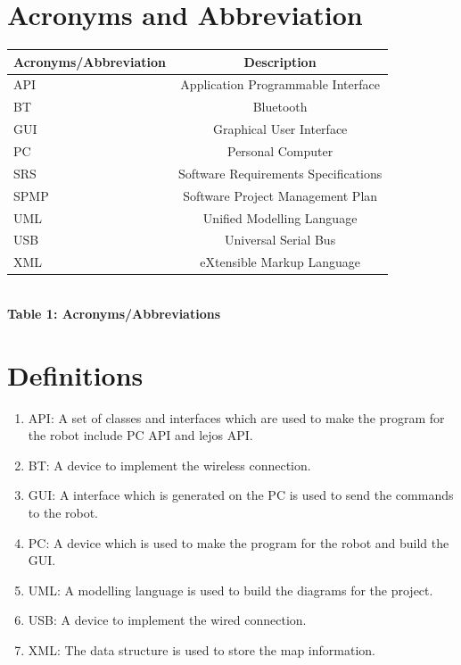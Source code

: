 \documentclass[11pt, a4paper]{report}
\begin{document}
\section{Acronyms and Abbreviation}
\begin{center}
\begin{tabular}{|l|c|}
  \hline
  \textbf{Acronyms/Abbreviation} & \textbf{Description}\\
  \hline
  API		& Application Programmable Interface \\
  \hline
  BT		& Bluetooth \\
  \hline
  GUI		& Graphical User Interface \\
  \hline
  PC		& Personal Computer\\
  \hline
  SRS	& Software Requirements Specifications \\
  \hline
  SPMP 	& Software Project Management Plan \\
  \hline
  UML	& Unified Modelling Language\\
  \hline
  USB	& Universal Serial Bus\\
  \hline
  XML 	& eXtensible Markup Language \\
  \hline
\end{tabular} \\[0.3cm]
\textbf {Table 1: Acronyms/Abbreviations} \\[0.3cm]
\end{center}
\section{Definitions}
\begin{enumerate}
\item API: A set of classes and interfaces which are used to make the program for the robot include PC API and lejos API.\\
\item BT: A device to implement the wireless connection.\\
\item GUI: A interface which is generated on the PC is used to send the commands to the robot.\\
\item PC: A device which is used to make the program for the robot and build the GUI.\\
\item UML: A modelling language is used to build the diagrams for the project.\\
\item USB: A device to implement the wired connection.\\
\item XML: The data structure is used to store the map information.\\
\end{enumerate}
\pagebreak
\newpage
\appendix

\pagebreak
\end{document}
